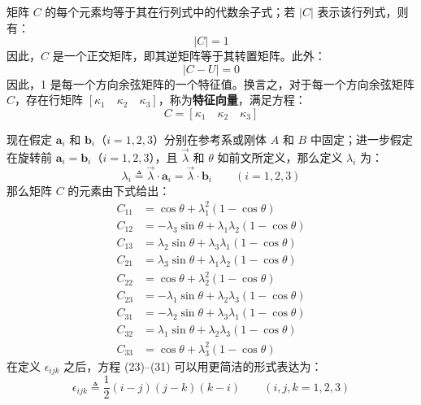 矩阵 \(C\) 的每个元素均等于其在行列式中的代数余子式；若 \(|C|\) 表示该行列式，则有：
\begin{equation}
|C| = 1 \tag{19}
\end{equation}
因此，\(C\) 是一个正交矩阵，即其逆矩阵等于其转置矩阵。此外：
\begin{equation}
|C - U| = 0 \tag{20}
\end{equation}
因此，1 是每一个方向余弦矩阵的一个特征值。换言之，对于每一个方向余弦矩阵 \(C\)，存在行矩阵 \([\kappa_1 \quad \kappa_2 \quad \kappa_3]\)，称为\textbf{特征向量}，满足方程：
\begin{equation}
[\kappa_1 \quad \kappa_2 \quad \kappa_3] C = [\kappa_1 \quad \kappa_2 \quad \kappa_3] \tag{21}
\end{equation}

现在假定 \(\mathbf{a}_i\) 和 \(\mathbf{b}_i\)（\(i=1, 2, 3\)）分别在参考系或刚体 \(A\) 和 \(B\) 中固定；进一步假定在旋转前 \(\mathbf{a}_i = \mathbf{b}_i\)（\(i=1, 2, 3\)），且 \(\vec{\lambda}\) 和 \(\theta\) 如前文所定义，那么定义 \(\lambda_i\) 为：
\begin{equation}
\lambda_i \triangleq \vec{\lambda} \cdot \mathbf{a}_i = \vec{\lambda} \cdot \mathbf{b}_i \qquad (i = 1, 2, 3) \tag{22}
\end{equation}
那么矩阵 \(C\) 的元素由下式给出：
\begin{align}
C_{11} &= \cos\theta + \lambda_1^2(1-\cos\theta) \tag{23} \\
C_{12} &= -\lambda_3 \sin\theta + \lambda_1\lambda_2(1-\cos\theta) \tag{24} \\
C_{13} &= \lambda_2 \sin\theta + \lambda_3\lambda_1(1-\cos\theta) \tag{25} \\
C_{21} &= \lambda_3 \sin\theta + \lambda_1\lambda_2(1-\cos\theta) \tag{26} \\
C_{22} &= \cos\theta + \lambda_2^2(1-\cos\theta) \tag{27} \\
C_{23} &= -\lambda_1 \sin\theta + \lambda_2\lambda_3(1-\cos\theta) \tag{28} \\
C_{31} &= -\lambda_2 \sin\theta + \lambda_3\lambda_1(1-\cos\theta) \tag{29} \\
C_{32} &= \lambda_1 \sin\theta + \lambda_2\lambda_3(1-\cos\theta) \tag{30} \\
C_{33} &= \cos\theta + \lambda_3^2(1-\cos\theta) \tag{31}
\end{align}
在定义 \(\epsilon_{ijk}\) 之后，方程 (23)--(31) 可以用更简洁的形式表达为：
\begin{equation}
\epsilon_{ijk} \triangleq \frac{1}{2}(i-j)(j-k)(k-i) \qquad (i, j, k = 1, 2, 3) \tag{32}
\end{equation}

